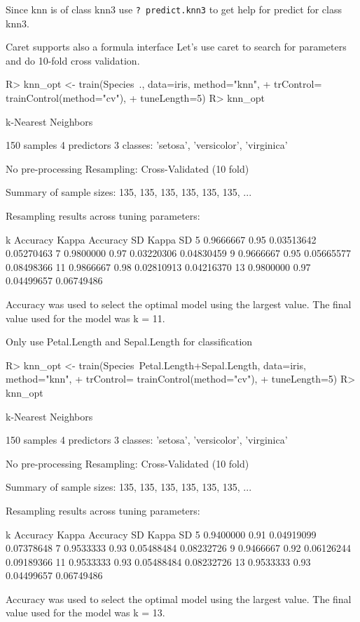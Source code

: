 \documentclass[fleqn, letter, 10pt]{article}
\begin{document}
Since knn is of class knn3 use
\verb|? predict.knn3| to get help for predict for class knn3.

Caret supports also a formula interface 
Let's use caret to search for parameters and do 10-fold cross validation.

\begin{Schunk}
\begin{Sinput}
R> knn_opt <- train(Species~., data=iris, method="knn", 
+     trControl= trainControl(method="cv"),
+     tuneLength=5)
R> knn_opt
\end{Sinput}
\begin{Soutput}
k-Nearest Neighbors 

150 samples
  4 predictors
  3 classes: 'setosa', 'versicolor', 'virginica' 

No pre-processing
Resampling: Cross-Validated (10 fold) 

Summary of sample sizes: 135, 135, 135, 135, 135, 135, ... 

Resampling results across tuning parameters:

  k   Accuracy   Kappa  Accuracy SD  Kappa SD  
   5  0.9666667  0.95   0.03513642   0.05270463
   7  0.9800000  0.97   0.03220306   0.04830459
   9  0.9666667  0.95   0.05665577   0.08498366
  11  0.9866667  0.98   0.02810913   0.04216370
  13  0.9800000  0.97   0.04499657   0.06749486

Accuracy was used to select the optimal model using  the
 largest value.
The final value used for the model was k = 11. 
\end{Soutput}
\end{Schunk}

Only use Petal.Length and Sepal.Length for classification
\begin{Schunk}
\begin{Sinput}
R> knn_opt <- train(Species~Petal.Length+Sepal.Length, data=iris, method="knn", 
+     trControl= trainControl(method="cv"),
+     tuneLength=5)
R> knn_opt
\end{Sinput}
\begin{Soutput}
k-Nearest Neighbors 

150 samples
  4 predictors
  3 classes: 'setosa', 'versicolor', 'virginica' 

No pre-processing
Resampling: Cross-Validated (10 fold) 

Summary of sample sizes: 135, 135, 135, 135, 135, 135, ... 

Resampling results across tuning parameters:

  k   Accuracy   Kappa  Accuracy SD  Kappa SD  
   5  0.9400000  0.91   0.04919099   0.07378648
   7  0.9533333  0.93   0.05488484   0.08232726
   9  0.9466667  0.92   0.06126244   0.09189366
  11  0.9533333  0.93   0.05488484   0.08232726
  13  0.9533333  0.93   0.04499657   0.06749486

Accuracy was used to select the optimal model using  the
 largest value.
The final value used for the model was k = 13. 
\end{Soutput}
\end{Schunk}
\end{document}
